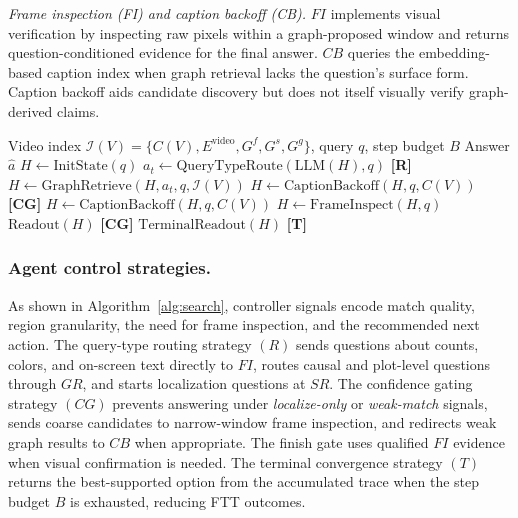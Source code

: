 \documentclass[letterpaper]{article} %
\begin{document}
\emph{Frame inspection (FI) and caption backoff (CB).}
\underline{$FI$} implements visual verification by inspecting raw pixels within a graph-proposed window and returns question-conditioned evidence for the final answer.
\underline{$CB$} queries the embedding-based caption index when graph retrieval lacks the question's surface form.
Caption backoff aids candidate discovery but does not itself visually verify graph-derived claims.

\begin{algorithm}[!tb]
  \caption{SGDAgent reasoning loop with control strategies: query-type routing (R), confidence gating (CG), and terminal convergence (T).}
  \label{alg:search}
  \begin{algorithmic}[1]
  \footnotesize
  \REQUIRE Video index $\mathcal{I}(V)=\{C(V),E^{\mathrm{video}},G^f,G^s,G^g\}$, query $q$, step budget $B$
  \ENSURE Answer $\hat{a}$
  \STATE $H \leftarrow \mathrm{InitState}(q)$
      \STATE $a_t \leftarrow \mathrm{QueryTypeRoute}(\mathrm{LLM}(H),q)$
        \hfill \textcolor{blue!60!black}{\small\textbf{[R]}}
          \STATE $H \leftarrow \mathrm{GraphRetrieve}(H,a_t,q,\mathcal{I}(V))$
              \STATE $H \leftarrow \mathrm{CaptionBackoff}(H,q,C(V))$
                \hfill \textcolor{blue!60!black}{\small\textbf{[CG]}}
          \ENDIF
          \STATE $H \leftarrow \mathrm{CaptionBackoff}(H,q,C(V))$
          \STATE $H \leftarrow \mathrm{FrameInspect}(H,q)$
          \RETURN $\mathrm{Readout}(H)$
            \hfill \textcolor{blue!60!black}{\small\textbf{[CG]}}
      \ENDIF
  \ENDFOR
  \RETURN $\mathrm{TerminalReadout}(H)$
    \hfill \textcolor{blue!60!black}{\small\textbf{[T]}}
  \end{algorithmic}
\end{algorithm}


\subsubsection{Agent control strategies.}
As shown in Algorithm~\ref{alg:search}, controller signals encode match quality, region granularity, the need for frame inspection, and the recommended next action.
The query-type routing strategy \underline{$(R)$} sends questions about counts, colors, and on-screen text directly to $FI$, routes causal and plot-level questions through $GR$, and starts localization questions at $SR$.
The confidence gating strategy \underline{$(CG)$} prevents answering under \emph{localize-only} or \emph{weak-match} signals, sends coarse candidates to narrow-window frame inspection, and redirects weak graph results to $CB$ when appropriate.
The finish gate uses qualified $FI$ evidence when visual confirmation is needed.
The terminal convergence strategy \underline{$(T)$} returns the best-supported option from the accumulated trace when the step budget $B$ is exhausted, reducing FTT outcomes.
\end{document}
